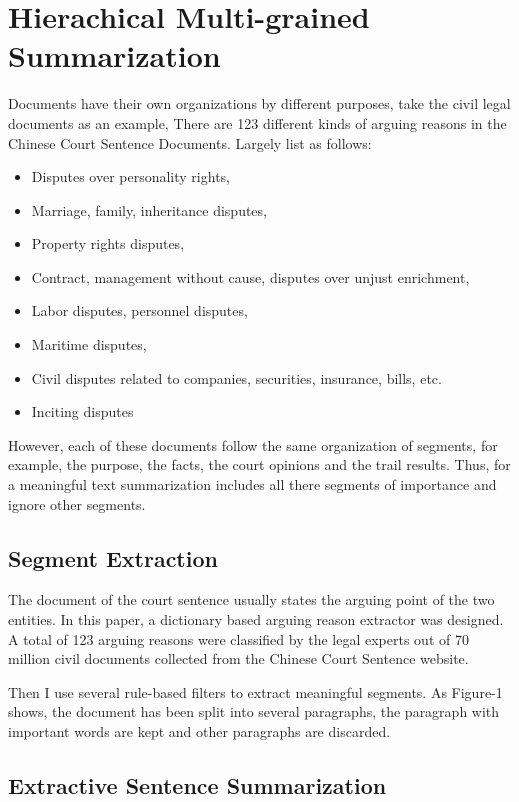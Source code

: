 \documentclass[11pt,a4paper]{article}
\begin{document}
\section{Hierachical Multi-grained Summarization}
\label{sec:hireachy}

Documents have their own organizations by different purposes, take the civil legal documents as an example,
There are 123 different kinds of arguing reasons in the Chinese Court Sentence Documents.
Largely list as follows:
\begin{itemize}
\item Disputes over personality rights,
\item Marriage, family, inheritance disputes,
\item Property rights disputes,
\item Contract, management without cause, disputes over unjust enrichment,
\item Labor disputes, personnel disputes,
\item Maritime disputes,
\item Civil disputes related to companies, securities, insurance, bills, etc.
\item Inciting disputes
\end{itemize}
However, each of these documents follow the same organization of segments, for example,
the purpose, the facts, the court opinions and the trail results.
Thus, for a meaningful text summarization includes all there segments of importance and ignore other segments.

\subsection{Segment Extraction}
The document of the court sentence usually states the arguing point of the two entities.
In this paper, a dictionary based arguing reason extractor was designed.
A total of 123 arguing reasons were classified by the legal experts out of 70 million
civil documents collected from the Chinese Court Sentence website.

Then I use several rule-based filters to extract meaningful segments.
As Figure-1 shows, the document has been split into several paragraphs,
the paragraph with important words are kept and other paragraphs are discarded.

\subsection{Extractive Sentence Summarization}
\end{document}
